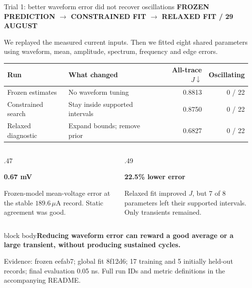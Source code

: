 \documentclass[aspectratio=169,11pt]{beamer}
\newcommand{\eyebrow}[1]{{\color{teal}\scriptsize\bfseries\MakeUppercase{#1}}\par\vspace{2mm}}
\newcommand{\takeaway}[1]{\par\vspace{2mm}\begin{beamercolorbox}[sep=2mm,wd=\linewidth]{block body}\small\bfseries #1\end{beamercolorbox}}
\newcommand{\src}[1]{\par\vfill{\fontsize{6.5}{8}\selectfont\color{muted}Evidence: #1. Full run IDs and metric definitions in the accompanying README.\par}}
\newcommand{\key}[2]{\par{\color{teal}\Large\bfseries #1}\par\small #2\par}
\begin{document}
\begin{frame}[t]{Trial 1: better waveform error did not recover oscillations}
\eyebrow{Frozen prediction $\rightarrow$ constrained fit $\rightarrow$ relaxed fit / 29 August}
\small We replayed the measured current inputs. Then we fitted eight shared parameters\\
using waveform, mean, amplitude, spectrum, frequency and edge errors.
\vspace{3mm}
\renewcommand{\arraystretch}{1.45}
\begin{tabular}{@{}p{3.1cm}p{4.8cm}rr@{}}
\toprule
\textbf{Run} & \textbf{What changed} & \textbf{All-trace $J\!\downarrow$} & \textbf{Oscillating}\\\midrule
Frozen estimates & No waveform tuning & 0.8813 & 0 / 22\\
Constrained search & Stay inside supported intervals & 0.8750 & 0 / 22\\
Relaxed diagnostic & Expand bounds; remove prior & 0.6827 & 0 / 22\\\bottomrule
\end{tabular}\par
\vspace{3mm}
\begin{columns}[T,onlytextwidth]
\begin{column}{.47\textwidth}
\key{0.67 mV}{Frozen-model mean-voltage error at the stable $189.6\,\mu$A record. Static agreement was good.}
\end{column}
\begin{column}{.49\textwidth}
\key{22.5\% lower error}{Relaxed fit improved $J$, but 7 of 8 parameters left their supported intervals. Only transients remained.}
\end{column}
\end{columns}
\takeaway{Reducing waveform error can reward a good average or a large transient, without producing sustained cycles.}
\src{frozen eefab7; global fit 8f12d6; 17 training and 5 initially held-out records; final evaluation 0.05 ns}
\end{frame}
\end{document}
